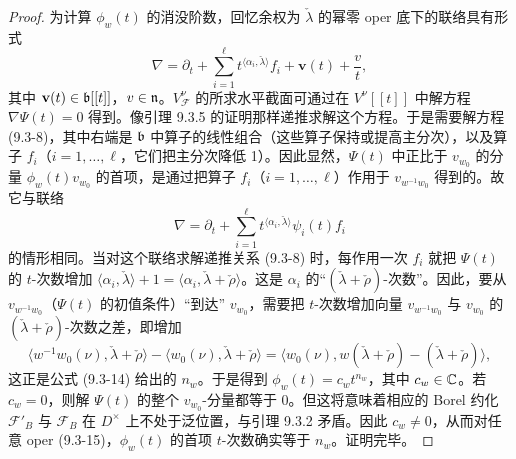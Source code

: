 \begin{proof}
为计算 $\phi_w(t)$ 的消没阶数，回忆余权为 $\check\lambda$ 的幂零 oper 底下的联络具有形式
\begin{equation}
\nabla = \partial_t + \sum_{i=1}^{\ell}t^{\langle\alpha_i,\check\lambda\rangle}f_i + \mathbf{v}(t) + \frac{v}{t},
\tag{9.3-15}
\end{equation}
其中 $\mathbf{v}(t)\in\mathfrak{b}[[t]]$，$v\in\mathfrak{n}$。$V^\nu_{\mathcal{F}}$ 的所求水平截面可通过在 $V^\nu[[t]]$ 中解方程 $\nabla\Psi(t)=0$ 得到。像引理 9.3.5 的证明那样递推求解这个方程。于是需要解方程 (9.3-8)，其中右端是 $\mathfrak{b}$ 中算子的线性组合（这些算子保持或提高主分次），以及算子 $f_i$（$i=1,\dots,\ell$，它们把主分次降低 1）。因此显然，$\Psi(t)$ 中正比于 $v_{w_0}$ 的分量 $\phi_w(t)v_{w_0}$ 的首项，是通过把算子 $f_i$（$i=1,\dots,\ell$）作用于 $v_{w^{-1}w_0}$ 得到的。故它与联络
\[
\nabla = \partial_t + \sum_{i=1}^{\ell}t^{\langle\alpha_i,\check\lambda\rangle}\psi_i(t)f_i
\]
的情形相同。当对这个联络求解递推关系 (9.3-8) 时，每作用一次 $f_i$ 就把 $\Psi(t)$ 的 $t$-次数增加 $\langle\alpha_i,\check\lambda\rangle+1 = \langle\alpha_i,\check\lambda+\check\rho\rangle$。这是 $\alpha_i$ 的“$(\check\lambda+\check\rho)$-次数”。因此，要从 $v_{w^{-1}w_0}$（$\Psi(t)$ 的初值条件）“到达” $v_{w_0}$，需要把 $t$-次数增加向量 $v_{w^{-1}w_0}$ 与 $v_{w_0}$ 的 $(\check\lambda+\check\rho)$-次数之差，即增加
\[
\langle w^{-1}w_0(\nu),\check\lambda+\check\rho\rangle-\langle w_0(\nu),\check\lambda+\check\rho\rangle = \langle w_0(\nu),w(\check\lambda+\check\rho)-(\check\lambda+\check\rho)\rangle,
\]
这正是公式 (9.3-14) 给出的 $n_w$。于是得到 $\phi_w(t) = c_wt^{n_w}$，其中 $c_w\in\mathbb{C}$。若 $c_w=0$，则解 $\Psi(t)$ 的整个 $v_{w_0}$-分量都等于 0。但这将意味着相应的 Borel 约化 $\mathcal{F}'_B$ 与 $\mathcal{F}_B$ 在 $D^\times$ 上不处于泛位置，与引理 9.3.2 矛盾。因此 $c_w\ne 0$，从而对任意 oper (9.3-15)，$\phi_w(t)$ 的首项 $t$-次数确实等于 $n_w$。证明完毕。
\end{proof}


